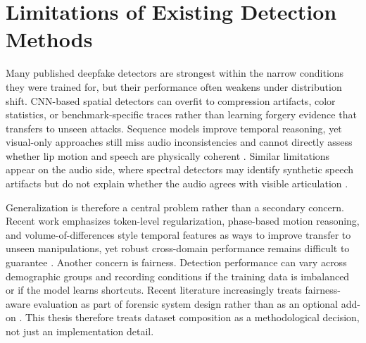 \section{Limitations of Existing Detection Methods}

Many published deepfake detectors are strongest within the narrow conditions they were trained for, but their performance often weakens under distribution shift. CNN-based spatial detectors can overfit to compression artifacts, color statistics, or benchmark-specific traces rather than learning forgery evidence that transfers to unseen attacks. Sequence models improve temporal reasoning, yet visual-only approaches still miss audio inconsistencies and cannot directly assess whether lip motion and speech are physically coherent \cite{nguyen2019capsule,afchar2018mesonet,guera2018deepfake,huang2024spatiotemporal}. Similar limitations appear on the audio side, where spectral detectors may identify synthetic speech artifacts but do not explain whether the audio agrees with visible articulation \cite{Tak2023Audio}.

Generalization is therefore a central problem rather than a secondary concern. Recent work emphasizes token-level regularization, phase-based motion reasoning, and volume-of-differences style temporal features as ways to improve transfer to unseen manipulations, yet robust cross-domain performance remains difficult to guarantee \cite{fu2025unbiased,prashnani2024phase,xu2025vod}. Another concern is fairness. Detection performance can vary across demographic groups and recording conditions if the training data is imbalanced or if the model learns shortcuts. Recent literature increasingly treats fairness-aware evaluation as part of forensic system design rather than as an optional add-on \cite{Ju2024Fairness,Kim2024Freq,mubarak2023survey}. This thesis therefore treats dataset composition as a methodological decision, not just an implementation detail.

